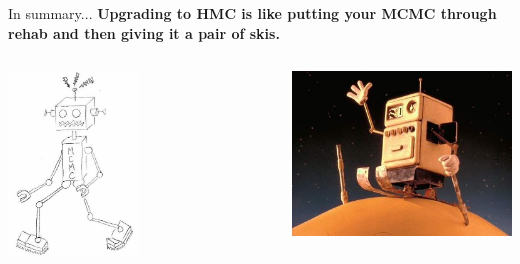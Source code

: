 \documentclass{beamer}
\begin{document}
    \begin{frame}{In summary...}
        \textbf{Upgrading to HMC is like putting your MCMC through rehab and then giving it a pair of skis.}
        \vspace{12pt}
        \pause
        \begin{columns}[c]
            \begin{column}{0.5\textwidth}
                \centering
                \includegraphics[width=0.5\textwidth]{mcmc-robot.jpg}
            \end{column}
            \pause
            \begin{column}{0.5\textwidth}
                \centering
                \includegraphics[width=\textwidth]{hmc-robot.jpg}
            \end{column}
        \end{columns}

    \end{frame}
\end{document}
